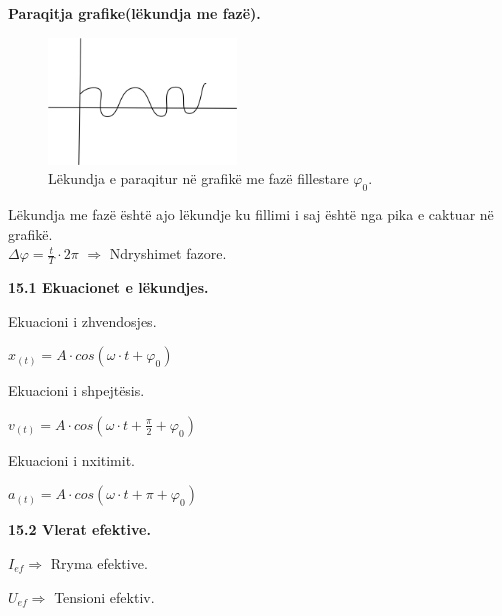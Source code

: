 \documentclass[twocolumn]{article}
\begin{document}
	
	\begin{center}
		\textbf{Paraqitja grafike(lëkundja me fazë).}
	\end{center}
	
	\begin{figure}[h]
		\includegraphics[width=50mm]{Imazhet/lekundjet me faz.png}
		\caption{Lëkundja e paraqitur në grafikë me fazë fillestare $\varphi_0$.}
		\label{fig:boat1}
	\end{figure}
	Lëkundja me fazë është ajo lëkundje ku fillimi i saj është nga pika e caktuar në grafikë.\\
	
	$\Delta \varphi=\frac{t}{T} \cdot 2\pi$ $\Rightarrow$ Ndryshimet fazore.\\
	
	\begin{center}
		\textbf{15.1 Ekuacionet e lëkundjes.}
		
	\end{center}
	
	\begin{center}
		Ekuacioni i zhvendosjes.
	\end{center}
	
	$x_{(t)}= A \cdot cos ( \omega \cdot t + \varphi_0)$
	
	\begin{center}
		Ekuacioni i shpejtësis.
	\end{center}
	
	$v_{(t)}= A \cdot cos (\omega\cdot t + \frac{\pi}{2} + \varphi_0)$
	
	\begin{center}
		Ekuacioni i nxitimit.
	\end{center}
	
	$a_{(t)}= A \cdot cos (\omega\cdot t + \pi +\varphi_0)$
	
	\begin{center}
		\textbf{15.2 Vlerat efektive.}
		
	\end{center}
	
	$I_{ef} \Rightarrow$ Rryma efektive.
	
	$U_{ef} \Rightarrow$ Tensioni efektiv.
	
\end{document}
